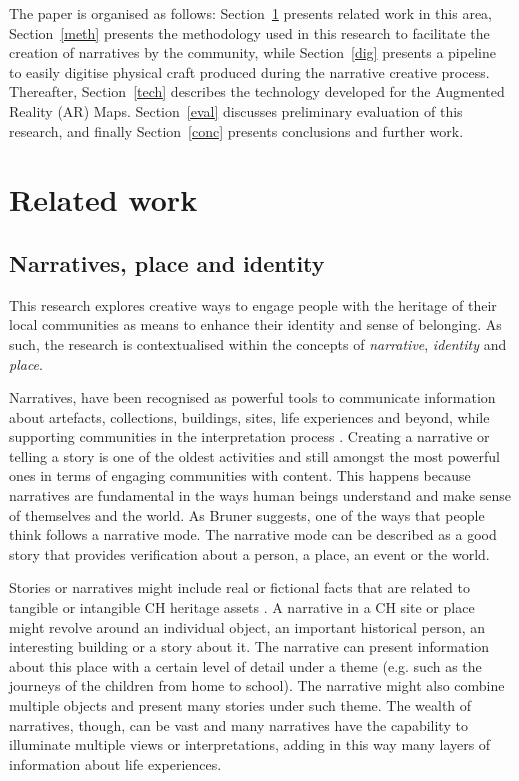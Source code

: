 \documentclass[acmlarge,screen,dvipsnames]{acmart}
\begin{document}
The paper is organised as follows: Section~\ref{ref} presents related
work in this area, Section~\ref{meth} presents the methodology used in
this research to facilitate the creation of narratives by the community,
while Section~\ref{dig} presents a pipeline to easily digitise physical
craft produced during the narrative creative process. Thereafter,
Section~\ref{tech} describes the technology developed for the Augmented
Reality (AR) Maps. Section~\ref{eval} discusses preliminary evaluation
of this research, and finally Section~\ref{conc} presents conclusions
and further work.


\section{Related work} 
\label{ref}
\subsection{Narratives, place and identity}
This research explores creative ways to engage people with the heritage of their local communities as means to enhance their identity and sense of belonging. As such, the research is contextualised within the concepts of \emph{narrative}, \emph{identity} and \emph{place}.

Narratives, have been recognised as powerful tools to communicate information about artefacts, collections, buildings, sites, life experiences and beyond, while supporting communities in the interpretation process \cite{Kelly2010,Pine2007}. Creating a narrative or telling a story is one of the oldest activities and still amongst the most powerful ones in terms of engaging communities with content. This happens because narratives are fundamental in the ways human beings understand and make sense of themselves and the world. As Bruner \cite{Bruner1986} suggests, one of the ways that people think follows a narrative mode. The narrative mode can be described as a good story that provides verification about a person, a place, an event or the world.

Stories or narratives might include real or fictional facts that are related to tangible or intangible CH heritage assets \cite{HandlerMiller2004}. A narrative in a CH site or place might revolve around an individual object, an important historical person, an interesting building or a story about it. The narrative can present information about this place with a certain level of detail under a theme (e.g. such as the journeys of the children from home to school). The narrative might also combine multiple objects and present many stories under such theme. The wealth of narratives, though, can be vast and many narratives have the capability to illuminate multiple views or interpretations, adding in this way many layers of information about life experiences.
\end{document}
